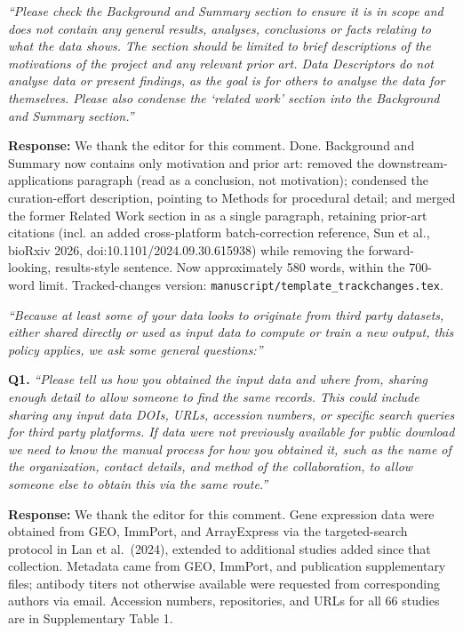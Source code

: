 \documentclass[11pt]{article}
\newcommand{\origcomment}[1]{\textit{``#1''}}
\newcommand{\filledresponse}[1]{%
  \par\medskip\noindent\textbf{Response:} #1\par
  \vspace{0.4cm}%
  \par\noindent\hrulefill\par\bigskip
}
\begin{document}
\begin{commentlist}
\item[E5.] \origcomment{Please check the Background and Summary section to ensure it is in scope
and does not contain any general results, analyses, conclusions or facts relating to what the
data shows. The section should be limited to brief descriptions of the motivations of the project
and any relevant prior art. Data Descriptors do not analyse data or present findings, as the goal
is for others to analyse the data for themselves. Please also condense the `related work' section
into the Background and Summary section.}
\filledresponse{We thank the editor for this comment. Done. Background and Summary now contains only motivation and prior art: removed
the downstream-applications paragraph (read as a conclusion, not motivation); condensed the
curation-effort description, pointing to Methods for procedural detail; and merged the former
Related Work section in as a single paragraph, retaining prior-art citations (incl. an added
cross-platform batch-correction reference, Sun et al., bioRxiv 2026, doi:10.1101/2024.09.30.615938)
while removing the forward-looking, results-style sentence. Now approximately 580 words, within the
700-word limit. Tracked-changes version: \texttt{manuscript/template\_trackchanges.tex}.}

\item[E6.] \origcomment{Because at least some of your data looks to originate from third party
datasets, either shared directly or used as input data to compute or train a new output, this
policy applies, we ask some general questions:}

\textbf{Q1.} \origcomment{Please tell us how you obtained the input data and where from, sharing
enough detail to allow someone to find the same records. This could include sharing any input
data DOIs, URLs, accession numbers, or specific search queries for third party platforms. If data
were not previously available for public download we need to know the manual process for how you
obtained it, such as the name of the organization, contact details, and method of the
collaboration, to allow someone else to obtain this via the same route.}
\filledresponse{We thank the editor for this comment. Gene expression data were obtained from GEO, ImmPort, and ArrayExpress via the
targeted-search protocol in Lan et al.~(2024), extended to additional studies added since that
collection. Metadata came from GEO, ImmPort, and publication supplementary files; antibody titers
not otherwise available were requested from corresponding authors via email. Accession numbers,
repositories, and URLs for all 66 studies are in Supplementary Table 1.}


\end{commentlist}
\end{document}
